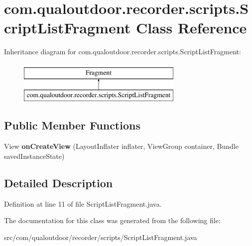 \hypertarget{classcom_1_1qualoutdoor_1_1recorder_1_1scripts_1_1ScriptListFragment}{\section{com.\-qualoutdoor.\-recorder.\-scripts.\-Script\-List\-Fragment Class Reference}
\label{classcom_1_1qualoutdoor_1_1recorder_1_1scripts_1_1ScriptListFragment}
}
Inheritance diagram for com.\-qualoutdoor.\-recorder.\-scripts.\-Script\-List\-Fragment\-:\begin{figure}[H]
\begin{center}
\leavevmode
\includegraphics[height=2.000000cm]{classcom_1_1qualoutdoor_1_1recorder_1_1scripts_1_1ScriptListFragment}
\end{center}
\end{figure}
\subsection*{Public Member Functions}
\begin{DoxyCompactItemize}
\item 
\hypertarget{classcom_1_1qualoutdoor_1_1recorder_1_1scripts_1_1ScriptListFragment_adf19ceaee6c2ccc3395ba471f37ea24f}{View {\bfseries on\-Create\-View} (Layout\-Inflater inflater, View\-Group container, Bundle saved\-Instance\-State)}\label{classcom_1_1qualoutdoor_1_1recorder_1_1scripts_1_1ScriptListFragment_adf19ceaee6c2ccc3395ba471f37ea24f}

\end{DoxyCompactItemize}


\subsection{Detailed Description}


Definition at line 11 of file Script\-List\-Fragment.\-java.



The documentation for this class was generated from the following file\-:\begin{DoxyCompactItemize}
\item 
src/com/qualoutdoor/recorder/scripts/Script\-List\-Fragment.\-java\end{DoxyCompactItemize}
